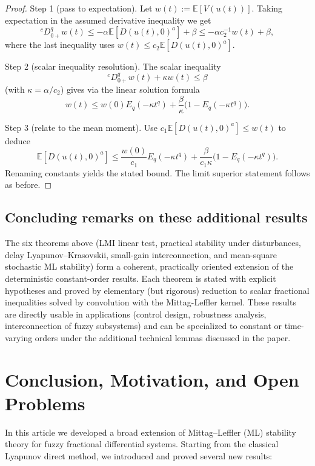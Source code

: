 \documentclass[11pt,a4paper]{article}
\theoremstyle{plain}
\theoremstyle{definition}
\theoremstyle{remark}
\newcommand{\Haus}{D}
\begin{document}
	\begin{proof}
		Step 1 (pass to expectation). Let \(w(t):= \mathbb{E}[V(u(t))]\). Taking expectation in the assumed derivative inequality we get
		\[
		{}^cD_{0+}^q w(t) \le -\alpha \mathbb{E}[\Haus(u(t),0)^a] + \beta \le -\alpha c_2^{-1} w(t) + \beta,
		\]
		where the last inequality uses \(w(t)\le c_2\mathbb{E}[\Haus(u(t),0)^a]\).
		
		Step 2 (scalar inequality resolution). The scalar inequality
		\[
		{}^cD_{0+}^q w(t) + \kappa w(t) \le \beta
		\]
		(with \(\kappa=\alpha/c_2\)) gives via the linear solution formula
		\[
		w(t)\le w(0)E_q(-\kappa t^q) + \frac{\beta}{\kappa}\big(1-E_q(-\kappa t^q)\big).
		\]
		
		Step 3 (relate to the mean moment). Use \(c_1\mathbb{E}[\Haus(u(t),0)^a]\le w(t)\) to deduce
		\[
		\mathbb{E}[\Haus(u(t),0)^a]\le \frac{w(0)}{c_1}E_q(-\kappa t^q)+\frac{\beta}{c_1\kappa}\big(1-E_q(-\kappa t^q)\big).
		\]
		Renaming constants yields the stated bound. The limit superior statement follows as before.
	\end{proof}
	
	\subsection{Concluding remarks on these additional results}
	
	The six theorems above (LMI linear test, practical stability under disturbances, delay Lyapunov–Krasovskii, small-gain interconnection, and mean-square stochastic ML stability) form a coherent, practically oriented extension of the deterministic constant-order results. Each theorem is stated with explicit hypotheses and proved by elementary (but rigorous) reduction to scalar fractional inequalities solved by convolution with the Mittag-Leffler kernel. These results are directly usable in applications (control design, robustness analysis, interconnection of fuzzy subsystems) and can be specialized to constant or time-varying orders under the additional technical lemmas discussed in the paper.
	
	\section{Conclusion, Motivation, and Open Problems}\label{sec:conclusion}
	
	In this article we developed a broad extension of Mittag--Leffler (ML) stability theory for fuzzy fractional differential systems. Starting from the classical Lyapunov direct method, we introduced and proved several new results:
	
\end{document}
